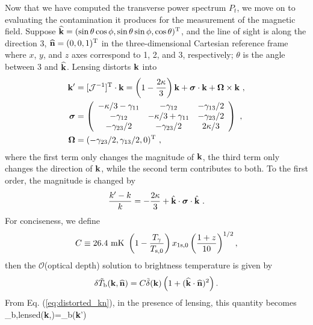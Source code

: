 Now that we have computed the transverse power spectrum $P_t$, we move on to evaluating the contamination it produces for the measurement of the magnetic field. Suppose ${\bf{\widehat k}}=(\sin\theta\cos\phi,\sin\theta\sin\phi,\cos\theta)^{\rm T}$, and the line of sight is along the direction 3, ${\bf{\widehat n}}=(0,0,1)^{\rm T}$ in the three-dimensional Cartesian reference frame where $x$, $y$, and $z$ axes correspond to 1, 2, and 3, respectively; $\theta$ is the angle between 3 and ${\bf{\widehat k}}$. Lensing distorts ${\bf{k}}$ into
\begin{align}
\label{eq:distorted_kn}
{\bf{k}}'&=[\mathcal{J}^{-1}]^{\rm T}\cdot{\bf{k}}=\left(1-\frac{2\kappa}{3}\right){\bf{k}}+{\bm{\sigma}}\cdot{\bf{k}}+{\bf{\Omega}}\times{\bf{k}}~,\\
\bm{\sigma}&=\left(\begin{array}{ccc}
-\kappa/3-\gamma_{11} & -\gamma_{12} & -\gamma_{13}/2 \\
-\gamma_{12} & -\kappa/3+\gamma_{11} & -\gamma_{23}/2 \\
-\gamma_{23}/2 & -\gamma_{23}/2 & 2\kappa/3
\end{array}\right)~,\nonumber\\
\bm{\Omega}&=(-\gamma_{23}/2,\gamma_{13}/2,0)^{\rm T}~,\nonumber
\end{align}
where the first term only changes the magnitude of ${\bf{k}}$, the third term only changes the direction of ${\bf{k}}$, while the second term contributes to both. To the first order, the magnitude is changed by
\begin{equation}
\frac{k'-k}{k}=-\frac{2\kappa}{3}+\hat{\bf{k}}\cdot\bm{\sigma}\cdot\hat{\bf{k}}~.
\end{equation}
For conciseness, we define
\begin{equation}
C\equiv 26.4\ {\rm mK}\ \left(1-\frac{T_\gamma}{T_{\rm s,0}}\right)x_{\rm 1s,0}\left(\frac{1+z}{10}\right)^{1/2},
\end{equation}
then the $\mathcal{O}$(optical depth) solution to brightness temperature is given by
\begin{equation}
\delta\tilde{T}_{\rm b}({\bf{k}},\widehat{\bf{n}})=C \tilde{\delta}({\bf{k}})\left(1+(\widehat{\bf{k}}\cdot\widehat{\bf{n}})^2\right).
\end{equation}
From Eq. (\ref{eq:distorted_kn}), in the presence of lensing, this quantity becomes
\beq
\bga
\delta{}_{\rm b,lensed}({\bf{k}},)=\delta{}_{\rm b}\left({\bf{k}}'\right) \simeq \\
